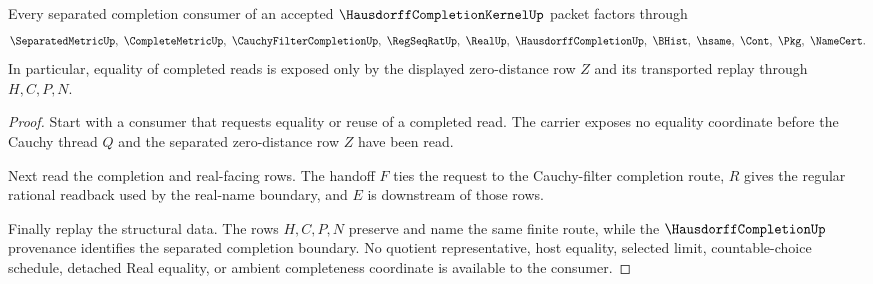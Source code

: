 \begin{theorem}
\label{thm:hausdorff-completion-kernel-nonescape}
Every separated completion consumer of an accepted $\HausdorffCompletionKernelUp$ packet factors through
$$
\SeparatedMetricUp,\ \CompleteMetricUp,\ \CauchyFilterCompletionUp,\ \RegSeqRatUp,\ \RealUp,\ \HausdorffCompletionUp,\ \BHist,\ \hsame,\ \Cont,\ \Pkg,\ \NameCert .
$$
In particular, equality of completed reads is exposed only by the displayed zero-distance row $Z$ and its transported replay through $H,C,P,N$.
\end{theorem}
\begin{proof}
Start with a consumer that requests equality or reuse of a completed read. The carrier exposes no equality coordinate before the Cauchy thread $Q$ and the separated zero-distance row $Z$ have been read.

Next read the completion and real-facing rows. The handoff $F$ ties the request to the Cauchy-filter completion route, $R$ gives the regular rational readback used by the real-name boundary, and $E$ is downstream of those rows.

Finally replay the structural data. The rows $H,C,P,N$ preserve and name the same finite route, while the $\HausdorffCompletionUp$ provenance identifies the separated completion boundary. No quotient representative, host equality, selected limit, countable-choice schedule, detached Real equality, or ambient completeness coordinate is available to the consumer.
\end{proof}




